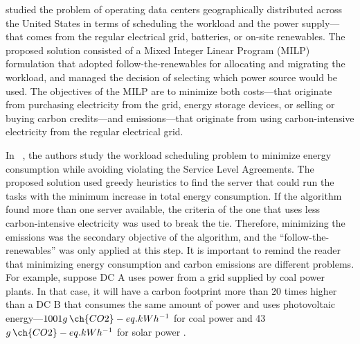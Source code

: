 \citet{RUIZDUARTE2023_operation_dcs_renewables} studied the problem of operating data centers geographically distributed across the United States in terms of scheduling the workload and the power supply---that comes from the regular electrical grid, batteries, or on-site renewables. The proposed solution consisted of a Mixed Integer Linear Program (MILP) formulation that adopted follow-the-renewables for allocating and migrating the workload, and managed the decision of selecting which power source would be used. The objectives of the MILP are to minimize both costs---that originate from purchasing electricity from the grid, energy storage devices, or selling or buying carbon credits---and  emissions---that originate from using carbon-intensive electricity from the regular electrical grid.

In ~\citet{KHODAYARSERESHT2023_energycarbonaware_vm}, the authors study the workload scheduling problem to minimize energy consumption while avoiding violating the Service Level Agreements. The proposed solution used greedy heuristics to find the server that could run the tasks with the minimum increase in total energy consumption. If the algorithm found more than one server available, the criteria of the one that uses less carbon-intensive electricity was used to break the tie. Therefore, minimizing the emissions was the secondary objective of the algorithm, and the ``follow-the-renewables'' was only applied at this step. It is important to remind the reader that minimizing energy consumption and carbon emissions are different problems. For example, suppose DC A uses power from a grid supplied by coal power plants. In that case, it will have a carbon footprint more than 20 times higher than a DC B that consumes the same amount of power and uses photovoltaic energy---$1001 g\,\ch{CO2}-eq.kWh^{-1}$ for coal power and 43  $g\,\ch{CO2}-eq.kWh^{-1}$ for solar power \cite{nrel_lifecycle_2021}. 

